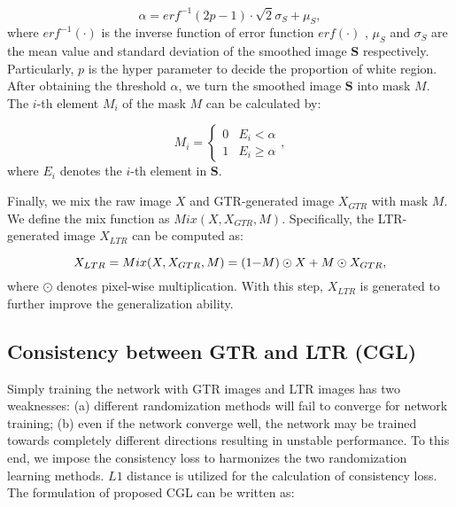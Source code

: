 \documentclass[twocolumn,journal,vlined,ruled,linesnumbered]{IEEEtran}
\begin{document}
\vspace{-2mm}

\begin{equation}
\alpha=erf^{-1}(2p-1)\cdot\sqrt{2}\sigma_{S}+\mu_{S},
\end{equation}
where $erf^{-1}(\cdot)$ is the inverse function of error function $erf(\cdot)$ \cite{andrews1998special}, $\mu_{S}$ and $\sigma_{S}$ are the mean value and standard deviation of the smoothed image $\mathbf{S}$ respectively. Particularly, $p$ is the hyper parameter to decide the proportion of white region. After obtaining the threshold $\alpha$, we turn the smoothed image $\mathbf{S}$ into mask $M$. The $i$-th element $M_{i}$ of the mask $M$ can be calculated by:

\vspace{-2mm}

\begin{equation}
M_{i}=\begin{cases}
0 & E_{i}<\alpha\\
1 & E_{i}\geq\alpha
\end{cases},
\end{equation}
where $E_{i}$ denotes the $i$-th element in $\mathbf{S}$.

Finally, we mix the raw image $X$ and GTR-generated image $X_{GTR}$ with mask $M$. We define the mix function as $Mix(X,X_{GTR},M)$. Specifically, the LTR-generated image $X_{LTR}$ can be computed as:

\vspace{-2mm}

\begin{equation}
X_{LTR}=Mix(X,X_{GTR},M)=(1\text{\textminus}M)\odot X+M\odot X_{GTR},
\end{equation}
where $\odot$ denotes pixel-wise multiplication. With this step, $X_{LTR}$ is generated to further improve the generalization ability.

\subsection{Consistency between GTR and LTR (CGL)\label{subsec:Consistency-between-TR}}

Simply training the network with GTR images and LTR images has two weaknesses: (a) different randomization methods will fail to converge for network training; (b) even if the network converge well, the network may be trained towards completely different directions resulting in unstable performance. To this end, we impose the consistency loss to harmonizes the two randomization learning methods. $L1$ distance is utilized for the calculation of consistency loss. The formulation of proposed CGL can be written as:
\end{document}
